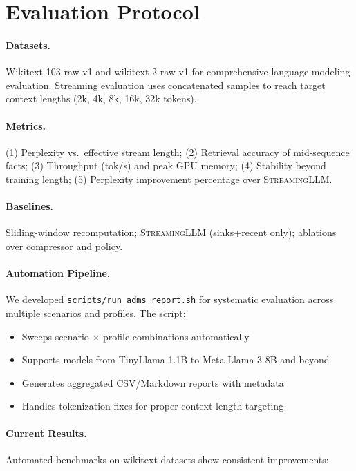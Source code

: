 \documentclass[11pt]{article}
\newcommand{\streaming}{\textsc{StreamingLLM}}
\begin{document}
\section{Evaluation Protocol}

\paragraph{Datasets.}
Wikitext-103-raw-v1 and wikitext-2-raw-v1 for comprehensive language modeling evaluation. Streaming evaluation uses concatenated samples to reach target context lengths (2k, 4k, 8k, 16k, 32k tokens).

\paragraph{Metrics.}
(1) Perplexity vs.\ effective stream length; (2) Retrieval accuracy of mid-sequence facts; (3) Throughput (tok/s) and peak GPU memory; (4) Stability beyond training length; (5) Perplexity improvement percentage over \streaming{}.


\paragraph{Baselines.}
Sliding-window recomputation; \streaming{} (sinks+recent only); ablations over compressor and policy.

\paragraph{Automation Pipeline.}
We developed \texttt{scripts/run\_adms\_report.sh} for systematic evaluation across multiple scenarios and profiles. The script:
\begin{itemize}
  \item Sweeps scenario $\times$ profile combinations automatically
  \item Supports models from TinyLlama-1.1B to Meta-Llama-3-8B and beyond
  \item Generates aggregated CSV/Markdown reports with metadata
  \item Handles tokenization fixes for proper context length targeting
\end{itemize}

\paragraph{Current Results.}
Automated benchmarks on wikitext datasets show consistent improvements:
\end{document}
